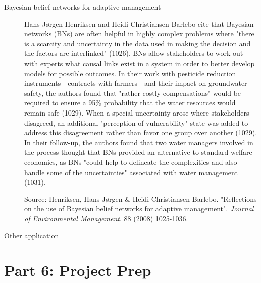 \documentclass[11pt]{amsart}
\begin{document}
\begin{description}

\item[Bayesian belief networks for adaptive management] Hans Jørgen Henriksen and Heidi Christiansen Barlebo cite that
Bayesian networks (BNs) are often helpful in highly complex problems where "there is a scarcity and uncertainty in the
data used in making the decision and the factors are interlinked" (1026).  BNs allow stakeholders to work out with
experts what causal links exist in a system in order to better develop models for possible outcomes.  In their work
with pesticide reduction instruments\----contracts with farmers\----and their impact on groundwater safety, the authors
found that "rather costly compensations" would be required to ensure a 95\% probability that the water resources would
remain safe (1029).  When a special uncertainty arose where stakeholders disagreed, an additional "perception of
vulnerability" state was added to address this disagreement rather than favor one group over another (1029).  In their
follow-up, the authors found that two water managers involved in the process thought that BNs provided an alternative to
standard welfare economics, as BNs "could help to delineate the complexities and also handle some of the uncertainties"
associated with water management (1031).

Source:
Henriksen, Hans Jørgen \& Heidi Christiansen Barlebo.
"Reflections on the use of Bayesian belief networks for adaptive management".
\emph{Journal of Environmental Management}.
88 (2008) 1025-1036.

\item[Other application]

\end{description}

\section*{Part 6: Project Prep}
\end{document}
